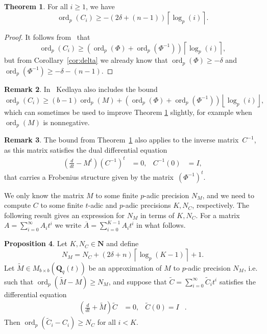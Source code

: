 \documentclass[a4paper,11pt]{article}
\numberwithin{equation}{section}
\providecommand{\floor}[1]{\left\lfloor#1\right\rfloor}   %
\providecommand{\ceil}[1]{\left\lceil#1\right\rceil}   %
\newcommand{\NN}{\mathbf{N}} %
\newcommand{\QQ}{\mathbf{Q}} %
\DeclareMathOperator{\ord}{ord}          %
\theoremstyle{definition}
\newtheorem{thm}{Theorem}[section]
\newtheorem{prop}[thm]{Proposition}
\newtheorem{rem}[thm]{Remark}
\begin{document}
\begin{thm} \label{thm:valC}
For all $i \geq 1$, we have
\begin{equation*}
\ord_p(C_i) \geq - \left(2 \delta + (n - 1)\right) \ceil{\log_p(i)}.
\end{equation*}
\end{thm}

\begin{proof}
It follows from~\citep[Theorem~{18.3.3}]{Kedlaya2010} that
\begin{equation*}
\ord_p(C_i) \geq \left( \ord_p(\Phi) + \ord_p(\Phi^{-1}) \right) \ceil{\log_p(i)},
\end{equation*}
but from Corollary~\ref{cor:delta} we already know that $\ord_p(\Phi) \geq -\delta$ and 
$\ord_p(\Phi^{-1}) \geq -\delta-(n-1)$.
\end{proof}

\begin{rem}
In~\citep[Remark~18.3.4]{Kedlaya2010} Kedlaya also includes the bound
\begin{equation*}
\ord_p(C_i) \geq (b - 1) \ord_p(M) 
            + \left( \ord_p(\Phi) + \ord_p(\Phi^{-1}) \right) \floor{\log_p(i)},
\end{equation*}
which can sometimes be used to improve Theorem \ref{thm:valC} 
slightly, for example when $\ord_p(M)$ is nonnegative.
\end{rem}

\begin{rem} \label{rem:Cinv}
The bound from Theorem~\ref{thm:valC} 
also applies to the inverse matrix~$C^{-1}$, as this matrix satisfies 
the dual differential equation 
\begin{align} \label{eq:01-GMDE-Dual}
\left(\frac{d}{dt} - M^t\right) \left(C^{-1}\right)^t &= 0, &C^{-1}(0)& = I,
\end{align}
that carries a Frobenius structure 
given by the matrix~$(\Phi^{-1})^t$.
\end{rem}

We only know the matrix $M$ to some finite $p$-adic precision 
$N_M$, and we need to compute $C$ to some finite $t$-adic and 
$p$-adic precisions $K,N_C$, respectively. The following result gives an 
expression for $N_M$ in terms of $K,N_C$. For a matrix 
$A=\sum_{i=0}^{\infty} A_i t^i$ we write 
$\overline{A}=\sum_{i=0}^{K-1} A_i t^i$ 
in what follows. 

\begin{prop} \label{prop:N_M}
Let $K,N_C \in \NN$ and define
\[
N_M= N_C + (2 \delta + n) \ceil{\log_p(K-1)}+1.
\]
Let $\tilde{M} \in M_{b \times b}(\QQ_q(t))$ be
an approximation of $M$ to $p$-adic precision $N_M$, i.e.
such that $\ord_p(\tilde{M}-M) \geq N_M$, and suppose that 
$\tilde{C}=\sum_{i=0}^{\infty} \tilde{C}_i t^i$ satisfies the
differential equation
\begin{align*}
\left(\frac{d}{dt}+\tilde{M} \right) \tilde{C}&=0, &\tilde{C}(0)=I&.
\end{align*}
Then $\ord_p(\tilde{C}_i-C_i) \geq N_C$ for all $i < K$.
\end{prop}
\end{document}
